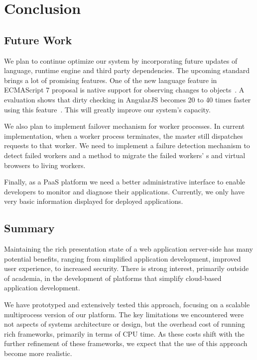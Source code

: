 \chapter{Conclusion}

\section{Future Work}

We plan to continue optimize our system by incorporating future updates of
\js language, \js runtime engine and third party dependencies.
The upcoming \js standard brings a lot of promising features.  One of the new
language feature in ECMAScript 7 proposal is native support for observing
changes to objects~\cite{jsobserveprop}. A evaluation shows that dirty
checking in AngularJS becomes 20 to 40 times faster using this
feature~\cite{angularjsspeedup}.
This will greatly improve our system's capacity.



We also plan to implement failover mechanism for 
 worker processes. 
In current implementation, when a worker process terminates, 
the master still dispatches requests to that worker.
We need to implement a failure detection mechanism to detect failed workers
and a method to migrate the failed workers' \appins{}s
and virtual browsers to living workers.


Finally, as a PaaS platform we need a better administrative interface 
to enable developers to monitor and diagnose their applications.
Currently, we only have very basic information displayed for deployed 
applications.

\section{Summary}

Maintaining the rich presentation state  of a web application server-side has
many potential benefits, ranging from simplified application development,
improved user experience, to increased security.  There is strong interest,
primarily outside of academia, in the development of platforms that simplify
cloud-based  application development.

We have prototyped and extensively tested this approach, focusing on a
scalable multiprocess version of our \cb{} platform. The key limitations we
encountered were not aspects of systems architecture or design,  but the
overhead cost of running rich frameworks, primarily in terms of CPU time.   As
these costs shift with the further refinement of these frameworks, we expect
that the use of this approach become more realistic.
